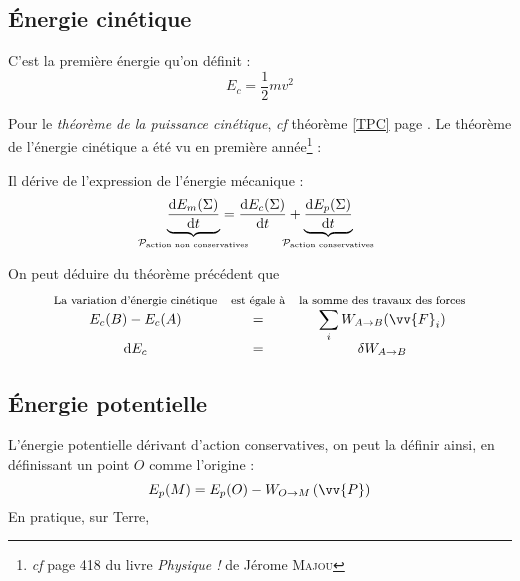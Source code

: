 \documentclass[11pt,a4paper,fleqn,pdftex]{report}
\begin{document}
\subsection{Énergie cinétique}
\begin{dfn}
C'est la première énergie qu'on définit : 
\begin{equation}
E_c = \frac{1}{2}m v^2
\end{equation}
%
\end{dfn}
%
Pour le \emph{théorème de la puissance cinétique}, \textit{cf} théorème \ref{TPC} page \pageref{TPC}.
Le théorème de l'énergie cinétique a été vu en première année\footnote{\textit{cf} page 418 du livre \textit{Physique !} de Jérome \textsc{Majou}} : 
\begin{theorem}
Il dérive de l'expression de l'énergie mécanique :
\begin{equation}
\underbrace{\der{E_m(\Sigma)}{t}}_{\mathclap{\mathcal{P}_\text{action non conservatives}}}=\der{E_c(\Sigma)}{t}+\underbrace{\der{E_p(\Sigma)}{t}}_{\mathclap{\mathcal{P}_\text{action conservatives}}}
\end{equation}
\end{theorem}
\begin{itheorem}
On peut déduire du théorème précédent que 
\begin{equation}
\begin{array}{c c c}
\text{\footnotesize La variation d'énergie cinétique}&\text{\footnotesize est égale à}&\text{{\footnotesize la somme des travaux des forces}}\\
E_c(B)-E_c(A)&=&\displaystyle\sum_i{}W_{A\rightarrow{}B}{(\vv{F}_i)}\\
\d{}E_c&=&\displaystyle\delta W_{A\rightarrow{}B}\\
\end{array}
\end{equation}
\end{itheorem}
\subsection{Énergie potentielle}
\begin{dfn}
L'énergie potentielle dérivant d'action conservatives, on peut la définir ainsi, en définissant un point $O$ comme l'origine : \\
\begin{equation}
E_p(M) = E_p(O) - W_{O\to M}\left( \vv{P} \right)
\end{equation}
En pratique, sur Terre, 
\end{dfn}
%
\end{document}
